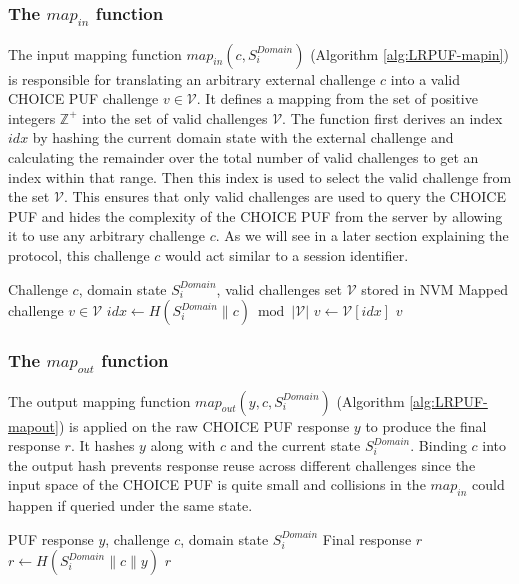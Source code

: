 \subsubsection{The $map_{in}$ function}
The input mapping function $map_{in}(c, S_i^{Domain})$ (Algorithm \ref{alg:LRPUF-mapin}) is responsible for translating an arbitrary external challenge $c$ into a valid CHOICE PUF challenge $v \in \mathcal{V}$. It defines a mapping from the set of positive integers $\mathbb{Z}^{+}$ into the set of valid challenges $\mathcal{V}$. The function first derives an index $idx$ by hashing the current domain state with the external challenge and calculating the remainder over the total number of valid challenges to get an index within that range. Then this index is used to select the valid challenge from the set $\mathcal{V}$. This ensures that only valid challenges are used to query the CHOICE PUF and hides the complexity of the CHOICE PUF from the server by allowing it to use any arbitrary challenge $c$. As we will see in a later section explaining the protocol, this challenge $c$ would act similar to a session identifier.

\begin{algorithm}[ht!]
\caption{$map_{in}(c, S_i^{Domain})$}
\begin{algorithmic}[1]
    \Require Challenge $c$, domain state $S_i^{Domain}$, valid challenges set $\mathcal{V}$ stored in NVM
    \Ensure  Mapped challenge $v \in \mathcal{V}$
    \State $idx \leftarrow H(S_i^{Domain} \mathbin\| c) \bmod |\mathcal{V}|$
    \State $v \leftarrow \mathcal{V}[idx]$
    \State \Return $v$
\end{algorithmic}
\label{alg:LRPUF-mapin}
\end{algorithm}

\subsubsection{The $map_{out}$ function}
The output mapping function $map_{out}(y, c, S_i^{Domain})$ (Algorithm \ref{alg:LRPUF-mapout}) is applied on the raw CHOICE PUF response $y$ to produce the final response $r$. It hashes $y$ along with $c$ and the current state $S_i^{Domain}$. Binding $c$ into the output hash prevents response reuse across different challenges since the input space of the CHOICE PUF is quite small and collisions in the $map_{in}$ could happen if queried under the same state.

\begin{algorithm}[ht!]
\caption{$map_{out}(y, c, S_i^{Domain})$}
\begin{algorithmic}[1]
    \Require PUF response $y$, challenge $c$, domain state $S_i^{Domain}$
    \Ensure  Final response $r$
    \State $r \leftarrow H(S_i^{Domain} \mathbin\| c \mathbin\| y)$
    \State \Return $r$
\end{algorithmic}
\label{alg:LRPUF-mapout}
\end{algorithm}

